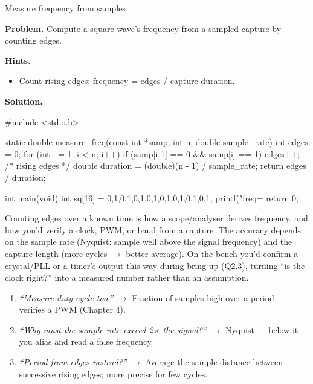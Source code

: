 \begin{gymproblem}{Measure frequency from samples}

\textbf{Problem.} Compute a square wave's frequency from a sampled capture by
counting edges.

\textbf{Hints.}
\begin{itemize}
\item Count rising edges; frequency = edges / capture duration.
\end{itemize}

\attempt

\textbf{Solution.}
\begin{cgym}
#include <stdio.h>

static double measure_freq(const int *samp, int n, double sample_rate) {
    int edges = 0;
    for (int i = 1; i < n; i++)
        if (samp[i-1] == 0 && samp[i] == 1) edges++;   /* rising edges */
    double duration = (double)(n - 1) / sample_rate;
    return edges / duration;
}

int main(void) {
    int sq[16] = {0,1,0,1,0,1,0,1,0,1,0,1,0,1,0,1};
    printf("freq=%
    return 0;
}
\end{cgym}

Counting edges over a known time is how a scope/analyser derives frequency, and
how you'd verify a clock, PWM, or baud from a capture. The accuracy depends on the
sample rate (Nyquist: sample well above the signal frequency) and the capture
length (more cycles $\rightarrow$ better average). On the bench you'd confirm a
crystal/PLL or a timer's output this way during bring-up (Q2.3), turning ``is the
clock right?'' into a measured number rather than an assumption.

\followups
\begin{enumerate}
\item \emph{``Measure duty cycle too.''} $\rightarrow$ Fraction of samples high
  over a period --- verifies a PWM (Chapter 4).
\item \emph{``Why must the sample rate exceed 2$\times$ the signal?''}
  $\rightarrow$ Nyquist --- below it you alias and read a false frequency.
\item \emph{``Period from edges instead?''} $\rightarrow$ Average the
  sample-distance between successive rising edges; more precise for few cycles.
\end{enumerate}
\end{gymproblem}

